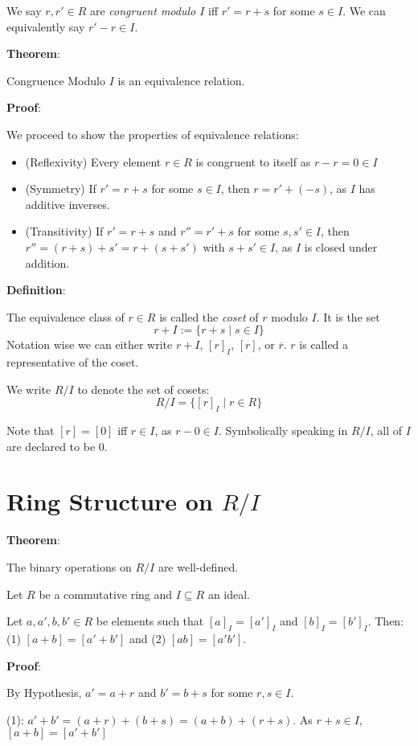 \documentclass{article}
\begin{document}
\begin{multicols*}{2}
We say $r, r' \in R$ are \textit{congruent modulo $I$} iff $r' = r+ s$ for some $s \in I$. We can equivalently say $r' - r \in I$.

\textbf{Theorem}:

Congruence Modulo $I$ is an equivalence relation.

\textbf{Proof}:

We proceed to show the properties of equivalence relations:

\begin{itemize}
    \item (Reflexivity) Every element $r \in R$ is congruent to itself as $r - r = 0 \in I$
    \item (Symmetry) If $r' = r + s$ for some $s \in I$, then  $r = r' + (-s)$, as $I$ has additive inverses.
    \item (Transitivity) If $r' = r+s$ and  $r'' = r' + s$ for some $s, s' \in I$, then $r'' = (r+s) + s' = r+(s + s')$ with $s+s' \in I$, as $I$ is closed under addition.
\end{itemize}

\textbf{Definition}:

The equivalence class of $r \in R$ is called the \textit{coset} of $r$ modulo $I$. It is the set\[r+I := \{r + s \;|\; s \in I\}\] Notation wise we can either write $r +I$, $[r]_I$, $[r]$, or $\overline {r}$. $r$ is called a representative of the coset.

We write $R/I$ to denote the set of cosets: \[R/I = \{[r]_I\;|\;r \in R\}\]

Note that $[r] = [0]$ iff $r \in I$, as $r -0 \in I$. Symbolically speaking in $R/I$, all of $I$ are declared to be $0$.

\section{Ring Structure on $R/I$}

\textbf{Theorem}:

The binary operations on $R/I$ are well-defined.

Let $R$ be a commutative ring and $I \subseteq R$ an ideal. 

Let $a, a', b, b' \in R$ be elements such that $[a]_I = [a']_I$ and $[b]_I = [b']_I$. Then: (1) $[a+b] = [a'+b']$ and (2) $[ab] = [a'b']$.

\textbf{Proof}:

By Hypothesis, $a'=a+r$ and $b' = b+s$ for some $r, s \in I$.

(1): $a' + b' = (a + r) + (b + s) = (a+b) + (r+s)$. As $r + s \in I$, $[a+b] = [a'+b']$


\end{multicols*}
\end{document}
